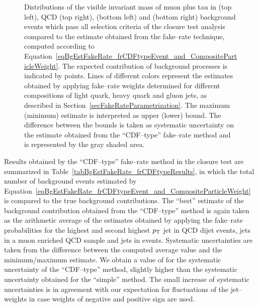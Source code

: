 \begin{figure}[t]
\begin{center}
\begin{picture}
\end{picture}
\caption[Visible mass in the fake--rate method]{\captiontext Distributions of
the visible invariant mass of muon plus tau in \WpJets (top left), QCD (top
right), \ttbarpJets (bottom left) and \ZMM (bottom right) background events
which pass all selection criteria of the closure test analysis compared to the
estimate obtained from the fake--rate technique, computed according to
Equation~\ref{eqBgEstFakeRate_frCDFtypeEvent_and_CompositeParticleWeight}.  The
expected contribution of background processes is indicated by points.  Lines of
different colors represent the estimates obtained by applying fake--rate weights
determined for different compositions of light quark, heavy quark and gluon
jets, as described in Section~\ref{secFakeRateParametrization}.  The maximum
(minimum) estimate is interpreted as upper (lower) bound.  The difference
between the bounds is taken as systematic uncertainty on the estimate obtained
from the ``CDF--type'' fake--rate method and is represented by the gray shaded
area.} \label{figBgEstFakeRate_frCDFtypeResults_mVisible}
\end{center}
\end{figure} 

Results obtained by the ``CDF--type'' fake--rate method in the closure test are
summarized in Table~\ref{tabBgEstFakeRate_frCDFtypeResults}, in which the total
number of background events estimated by
Equation~\ref{eqBgEstFakeRate_frCDFtypeEvent_and_CompositeParticleWeight} is
compared to the true background contributions.  The ``best'' estimate of the
background contribution obtained from the ``CDF--type'' method is again taken as
the arithmetic average of the estimates obtained by applying the fake--rate
probabilities for the highest and second highest $\pt$ jet in QCD dijet
events, jets in a muon enriched QCD sample and jets in \WpJets events.
Systematic uncertainties are taken from the difference between the computed
average value and the minimum/maximum estimate.  We obtain a value of 
 for the systematic uncertainty of the ``CDF--type'' method,
slightly higher than the systematic uncertainty obtained for the ``simple''
method.  The small increase of systematic uncertainties is in agreement with our
expectation for fluctuations of the jet--weights in case weights of negative and
positive sign are used.

